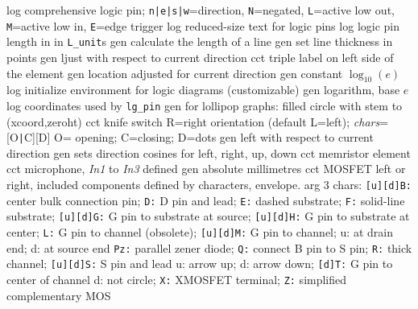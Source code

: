   {log}
  {comprehensive logic pin; {\tt n|e|s|w}=direction, {\tt N}=negated,
    {\tt L}=active low out, {\tt M}=active low in, {\tt E}=edge trigger}
  {log}
  {reduced-size text for logic pins}
  {log}
  {logic pin length in in {\tt L\_unit}s}
  {gen}
  {calculate the length of a line}
  {gen}
  {set line thickness in points}
  {gen}
  {ljust with respect to current direction}
  {cct}
  {triple label on left side of the element}
  {gen}
  {location adjusted for current direction}
  {gen}
  {constant $\log_{10}(e)$}
  {log}
  {initialize environment for logic diagrams (customizable)}
  {gen}
  {logarithm, base $e$}
  {log}
  {coordinates used by {\tt lg\_pin}}
  {gen}
  {for lollipop graphs: filled circle with stem to (xcoord,zeroht)}
  {cct}
  {knife switch R=right orientation (default L=left); {\sl chars}=[O{\tt|}C][D] O= opening; C=closing; D=dots }
  {gen}
  {left with respect to current direction}
  {gen}
  {sets direction cosines for left, right, up, down}
  {cct}
  {memristor element}
  {cct}
  {microphone, {\sl In1} to {\sl In3} defined}
  {gen}
  {absolute millimetres}
  {cct}
  {MOSFET left or right, included components defined by characters, envelope.
   arg 3 chars:
      {\tt [u][d]B:} center bulk connection pin;
      {\tt D:} D pin and lead;
      {\tt E:} dashed substrate;
      {\tt F:} solid-line substrate;
      {\tt [u][d]G:} G pin to substrate at source;
      {\tt [u][d]H:} G pin to substrate at center;
      {\tt L:} G pin to channel (obsolete);
      {\tt [u][d]M:} G pin to channel; u: at drain end; d: at source end
      {\tt Pz:} parallel zener diode;
      {\tt Q:} connect B pin to S pin;
      {\tt R:} thick channel;
      {\tt [u][d]S:} S pin and lead u: arrow up; d: arrow down;
      {\tt [d]T:} G pin to center of channel d: not circle;
      {\tt X:} XMOSFET terminal;
      {\tt Z:} simplified complementary MOS
}
